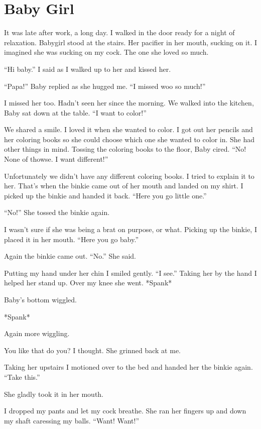 \section{Baby Girl}

    It was late after work, a long day. I walked in the door ready for a night of relaxation. Babygirl stood at the stairs. Her pacifier in her mouth, sucking on it. I imagined she was sucking on my cock. The one she loved so much.

    “Hi baby.” I said as I walked up to her and kissed her.

    “Papa!” Baby replied as she hugged me. “I missed woo so much!”

    I missed her too. Hadn’t seen her since the morning. We walked into the kitchen, Baby sat down at the table. “I want to color!”

    We shared a smile. I loved it when she wanted to color. I got out her pencils and her coloring books so she could choose which one she wanted to color in. She had other things in mind. Tossing the coloring books to the floor, Baby cired. “No! None of thowse. I want different!”

    Unfortunately we didn’t have any different coloring books. I tried to explain it to her. That’s when the binkie came out of her mouth and landed on my shirt. I picked up the binkie and handed it back. “Here you go little one.”

    “No!” She tossed the binkie again.

    I wasn’t sure if she was being a brat on purpose, or what. Picking up the binkie, I placed it in her mouth. “Here you go baby.”

    Again the binkie came out. “No.” She said.

    Putting my hand under her chin I smiled gently. “I see.” Taking her by the hand I helped her stand up. Over my knee she went. *Spank*

    Baby’s bottom wiggled.

    *Spank*

    Again more wiggling.

    You like that do you? I thought. She grinned back at me.

    Taking her upstairs I motioned over to the bed and handed her the binkie again. “Take this.”

    She gladly took it in her mouth.

    I dropped my pants and let my cock breathe. She ran her fingers up and down my shaft caressing my balls. “Want! Want!”

